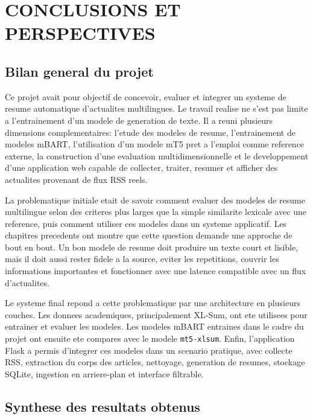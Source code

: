 \chapter{CONCLUSIONS ET PERSPECTIVES}\label{chap:conclusions-perspectives}
\thispagestyle{empty}

\section{Bilan general du projet}

Ce projet avait pour objectif de concevoir, evaluer et integrer un systeme de resume automatique d'actualites multilingues. Le travail realise ne s'est pas limite a l'entrainement d'un modele de generation de texte. Il a reuni plusieurs dimensions complementaires: l'etude des modeles de resume, l'entrainement de modeles mBART, l'utilisation d'un modele mT5 pret a l'emploi comme reference externe, la construction d'une evaluation multidimensionnelle et le developpement d'une application web capable de collecter, traiter, resumer et afficher des actualites provenant de flux RSS reels.

La problematique initiale etait de savoir comment evaluer des modeles de resume multilingue selon des criteres plus larges que la simple similarite lexicale avec une reference, puis comment utiliser ces modeles dans un systeme applicatif. Les chapitres precedents ont montre que cette question demande une approche de bout en bout. Un bon modele de resume doit produire un texte court et lisible, mais il doit aussi rester fidele a la source, eviter les repetitions, couvrir les informations importantes et fonctionner avec une latence compatible avec un flux d'actualites.

Le systeme final repond a cette problematique par une architecture en plusieurs couches. Les donnees academiques, principalement XL-Sum, ont ete utilisees pour entrainer et evaluer les modeles. Les modeles mBART entraines dans le cadre du projet ont ensuite ete compares avec le modele \texttt{mt5-xlsum}. Enfin, l'application Flask a permis d'integrer ces modeles dans un scenario pratique, avec collecte RSS, extraction du corps des articles, nettoyage, generation de resumes, stockage SQLite, ingestion en arriere-plan et interface filtrable.

\section{Synthese des resultats obtenus}

